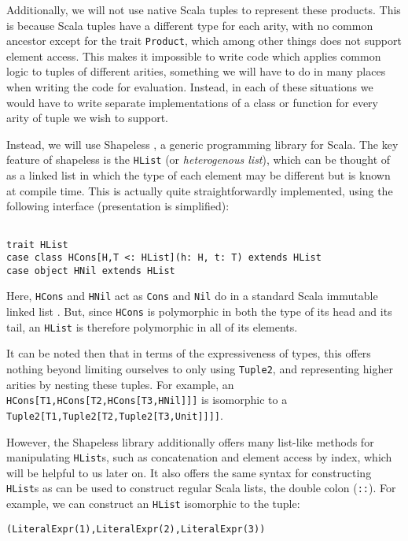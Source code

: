 Additionally, we will not use native Scala tuples to represent these products. This is because Scala tuples have a different type for each arity, with no common ancestor except for the trait \lstinline{Product}, which among other things does not support element access. This makes it impossible to write code which applies common logic to tuples of different arities, something we will have to do in many places when writing the code for evaluation. Instead, in each of these situations we would have to write separate implementations of a class or function for every arity of tuple we wish to support.
	
Instead, we will use Shapeless \cite{shapeless}, a generic programming library for Scala. The key feature of shapeless is the \lstinline{HList} (or \textit{heterogenous list}), which can be thought of as a linked list in which the type of each element may be different but is known at compile time. This is actually quite straightforwardly implemented, using the following interface (presentation is simplified):

\begin{lstlisting}

trait HList
case class HCons[H,T <: HList](h: H, t: T) extends HList
case object HNil extends HList
\end{lstlisting} \vspace{1em}

Here, \lstinline{HCons} and \lstinline{HNil} act as \lstinline{Cons} and \lstinline{Nil} do in a standard Scala immutable linked list \cite{scalalist}. But, since \lstinline{HCons} is polymorphic in both the type of its head and its tail, an \lstinline{HList} is therefore polymorphic in all of its elements.

It can be noted then that in terms of the expressiveness of types, this offers nothing beyond limiting ourselves to only using \lstinline{Tuple2}, and representing higher arities by nesting these tuples. For example, an \lstinline{HCons[T1,HCons[T2,HCons[T3,HNil]]]} is isomorphic to a \lstinline{Tuple2[T1,Tuple2[T2,Tuple2[T3,Unit]]]]}.

However, the Shapeless library additionally offers many list-like methods for manipulating \lstinline{HList}s, such as concatenation and element access by index, which will be helpful to us later on. It also offers the same syntax for constructing \lstinline{HList}s as can be used to construct regular Scala lists, the double colon (\lstinline{::}). For example, we can construct an \lstinline{HList} isomorphic to the tuple:
\begin{lstlisting}
(LiteralExpr(1),LiteralExpr(2),LiteralExpr(3))
\end{lstlisting}

